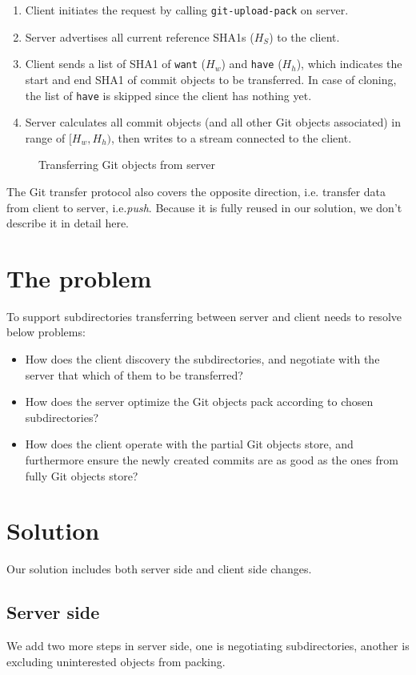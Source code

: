 \documentclass[preprint]{sigplanconf}
\begin{document}
\begin{enumerate}
  \item Client initiates the request by calling \verb|git-upload-pack| on server.
  \item Server advertises all current reference SHA1s ($H_S$) to the client.
  \item Client sends a list of SHA1 of \verb|want| ($H_w$) and \verb|have| ($H_h$), which indicates the start and end SHA1 of commit objects to be transferred.
    In case of cloning, the list of \verb|have| is skipped since the client has nothing yet.
  \item Server calculates all commit objects (and all other Git objects associated) in range of $[H_w, H_h)$, then writes to a stream connected to the client.
\end{enumerate}

\begin{figure}[htpb]
  \centering
  
  \caption{Transferring Git objects from server}
  \label{fig:git-proto-clone-seq}
\end{figure}
The Git transfer protocol also covers the opposite direction, i.e. transfer
data from client to server, i.e.\emph{push}.
Because it is fully reused in our solution, we don't describe it in detail
here.

\section{The problem}
To support subdirectories transferring between server and client needs to
resolve below problems:
\begin{itemize}
  \item How does the client discovery the subdirectories, and negotiate with
      the server that which of them to be transferred?
  \item How does the server optimize the Git objects pack according to chosen
      subdirectories?
  \item How does the client operate with the partial Git objects store, and
      furthermore ensure the newly created commits are as good as the ones
      from fully Git objects store?
\end{itemize}

\section{Solution}
Our solution includes both server side and client side changes.
\subsection{Server side}
We add two more steps in server side, one is negotiating subdirectories, another is excluding uninterested objects from packing.
\end{document}
